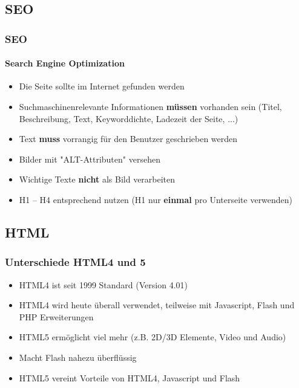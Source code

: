 \documentclass[xcolor=dvipsnames]{beamer}
\begin{document}
\subsection{SEO}
\begin{frame} %
  \frametitle{SEO} %
  \framesubtitle{Search Engine Optimization} %
  \begin{block}{}
	\begin{itemize}
		\item Die Seite sollte im Internet gefunden werden
	\end{itemize}
  \end{block}
  \begin{alertblock}{}
	\begin{itemize}
		\item Suchmaschinenrelevante Informationen \textbf{müssen} vorhanden sein (Titel, Beschreibung, Text, Keyworddichte, Ladezeit der Seite, ...)
		\item Text \textbf{muss} vorrangig für den Benutzer geschrieben werden
		\item Bilder mit "ALT-Attributen" versehen
		\item Wichtige Texte \textbf{nicht} als Bild verarbeiten
		\item H1 – H4 entsprechend nutzen (H1 nur \textbf{einmal} pro Unterseite verwenden)
	\end{itemize}
  \end{alertblock}
\end{frame}


\subsection{HTML}
\begin{frame} %
  \frametitle{Unterschiede HTML4 und 5} %
  \begin{block}{}
	\begin{itemize}
		\item HTML4 ist seit 1999 Standard (Version 4.01)
		\item HTML4 wird heute überall verwendet, teilweise mit Javascript, Flash und PHP Erweiterungen
		\item HTML5 ermöglicht viel mehr (z.B. 2D/3D Elemente, Video und Audio)
		\item Macht Flash nahezu überflüssig
		\item HTML5 vereint Vorteile von HTML4, Javascript und Flash
	\end{itemize}
  \end{block}
\end{frame}
\end{document}

